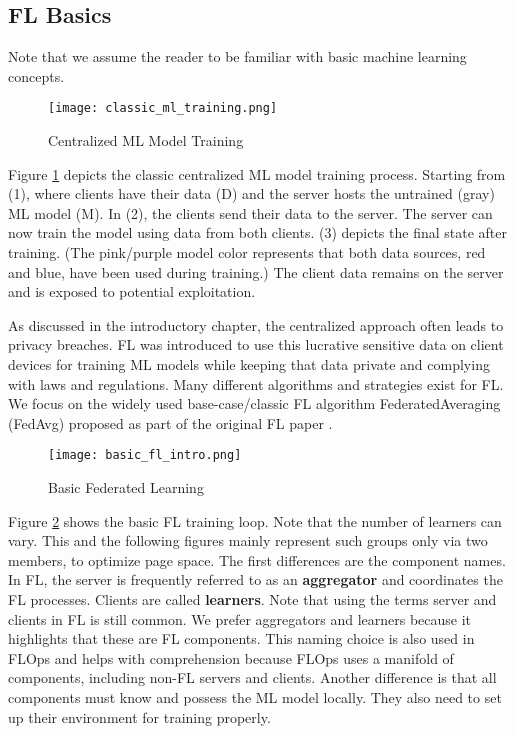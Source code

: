 
\subsection{FL Basics}

Note that we assume the reader to be familiar with basic machine learning concepts.

\begin{figure}[h]
    \centering
    \texttt{[image: classic\_ml\_training.png]}
    \caption{Centralized ML Model Training}
    \label{fig:classic_ml_training}
\end{figure}
Figure \ref{fig:classic_ml_training} depicts the classic centralized ML model training process.
Starting from (1), where clients have their data (D) and
the server hosts the untrained (gray) ML model (M).
In (2), the clients send their data to the server.
The server can now train the model using data from both clients.
(3) depicts the final state after training.
(The pink/purple model color represents that both data sources, red and blue,
have been used during training.)
The client data remains on the server and is exposed to potential exploitation.

As discussed in the introductory chapter, the centralized approach often leads to
privacy breaches. FL was introduced to use this lucrative sensitive data
on client devices for training ML models while keeping that data private and 
complying with laws and regulations.
Many different algorithms and strategies exist for FL.
We focus on the widely used base-case/classic FL algorithm FederatedAveraging (FedAvg)
proposed as part of the original FL paper \cite{paper:original_fl}.

\begin{figure}%
    \centering
    \texttt{[image: basic\_fl\_intro.png]}
    \caption{Basic Federated Learning}
    \label{fig:basic_fl_intro}
\end{figure}
Figure \ref{fig:basic_fl_intro} shows the basic FL training loop.
Note that the number of learners can vary.
This and the following figures mainly represent such groups
only via two members, to optimize page space.
The first differences are the component names.
In FL, the server is frequently referred to as an \textbf{aggregator}
and coordinates the FL processes.
Clients are called \textbf{learners}.
Note that using the terms server and clients in FL is still common.
We prefer aggregators and learners because it highlights that these are FL components.
This naming choice is also used in FLOps and helps with comprehension
because FLOps uses a manifold of components, including non-FL servers and clients.
Another difference is that all components must know and possess the ML model locally.
They also need to set up their environment for training properly.

